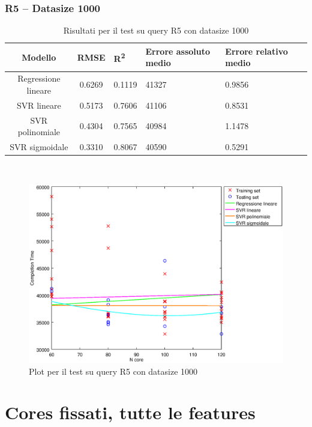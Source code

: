 \documentclass[a4paper,11pt]{article}
\begin{document}
\subsubsection{R5 -- Datasize 1000}
\begin{table}[bhpt]
	\centering
	\begin{adjustbox}{center}
		\begin{tabular}{c | c M{1.2cm} M{2.5cm} M{2.5cm} M{1.8cm}}
			Modello & RMSE & R\textsuperscript{2} & Errore assoluto medio & Errore relativo medio \tabularnewline
			\hline
			Regressione lineare & 0.6269 & 0.1119 &  41327 & 0.9856 \\
			SVR lineare & 0.5173 & 0.7606 &  41106 & 0.8531 \\
			SVR polinomiale & 0.4304 & 0.7565 &  40984 & 1.1478 \\
			SVR sigmoidale & 0.3310 & 0.8067 &  40590 & 0.5291 \\
		\end{tabular}
	\end{adjustbox}
	\\
	\caption{Risultati per il test su query R5 con datasize 1000}
	\label{table_R5_1000}
\end{table}

\begin {figure}[hbtp]
\centering
\includegraphics[width=\textwidth]{output/R5_1000/plot_R5_1000.eps}
\caption {Plot per il test su query R5 con datasize 1000}
\end {figure}

\newpage
\section{Cores fissati, tutte le features}
\end{document}

